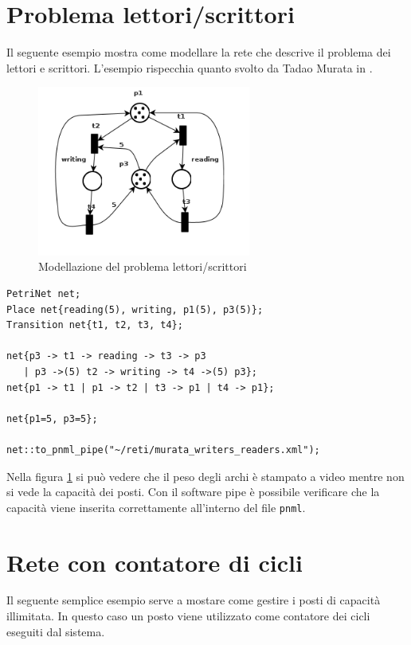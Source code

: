 \documentclass[italian,12pt]{book}
\begin{document}
\section{Problema lettori/scrittori}
Il seguente esempio mostra come modellare la rete che descrive il problema dei lettori e scrittori. L'esempio rispecchia quanto svolto da Tadao Murata in \cite{MURATA}.

\begin{figure}[htb]
\centerline{\includegraphics[width=7cm]{img/murata_writers_readers.png}}
\caption{Modellazione del problema lettori/scrittori}\label{fig:let_scrit.png}
\end{figure}

\begin{verbatim}PetriNet net;
Place net{reading(5), writing, p1(5), p3(5)};
Transition net{t1, t2, t3, t4};

net{p3 -> t1 -> reading -> t3 -> p3 
   | p3 ->(5) t2 -> writing -> t4 ->(5) p3};
net{p1 -> t1 | p1 -> t2 | t3 -> p1 | t4 -> p1};

net{p1=5, p3=5};

net::to_pnml_pipe("~/reti/murata_writers_readers.xml");
\end{verbatim}

Nella figura \ref{fig:let_scrit.png} si può vedere che il peso degli archi è stampato a video mentre non si vede la capacità dei posti. Con il software pipe è possibile verificare che la capacità viene inserita correttamente all'interno del file {\tt pnml}.

\section{Rete con contatore di cicli}
Il seguente semplice esempio serve a mostare come gestire i posti di
capacità illimitata. In questo caso un posto viene utilizzato come
contatore dei cicli eseguiti dal sistema.
\end{document}
